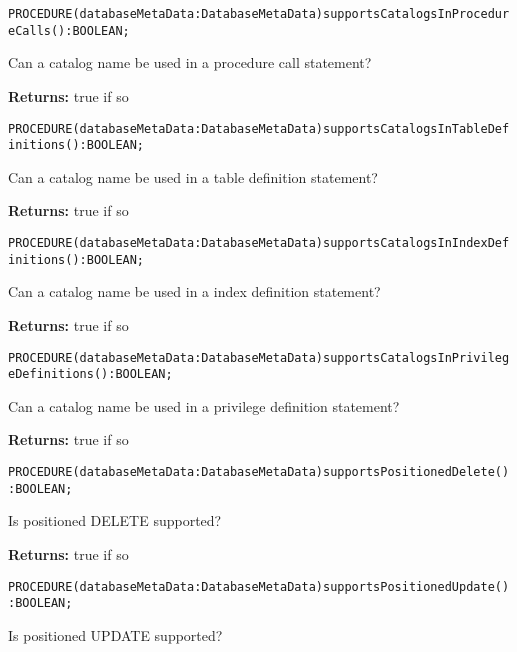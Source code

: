 \verb'PROCEDURE(databaseMetaData:DatabaseMetaData)supportsCatalogsInProcedureCalls():BOOLEAN;'






Can a catalog name be used in a procedure call statement? 


{\bf Returns: } 
true if so 




\verb'PROCEDURE(databaseMetaData:DatabaseMetaData)supportsCatalogsInTableDefinitions():BOOLEAN;'






Can a catalog name be used in a table definition statement? 


{\bf Returns: } 
true if so 




\verb'PROCEDURE(databaseMetaData:DatabaseMetaData)supportsCatalogsInIndexDefinitions():BOOLEAN;'






Can a catalog name be used in a index definition statement? 


{\bf Returns: } 
true if so 




\verb'PROCEDURE(databaseMetaData:DatabaseMetaData)supportsCatalogsInPrivilegeDefinitions():BOOLEAN;'






Can a catalog name be used in a privilege definition statement? 


{\bf Returns: } 
true if so 




\verb'PROCEDURE(databaseMetaData:DatabaseMetaData)supportsPositionedDelete():BOOLEAN;'






Is positioned DELETE supported? 


{\bf Returns: } 
true if so 




\verb'PROCEDURE(databaseMetaData:DatabaseMetaData)supportsPositionedUpdate():BOOLEAN;'






Is positioned UPDATE supported? 


